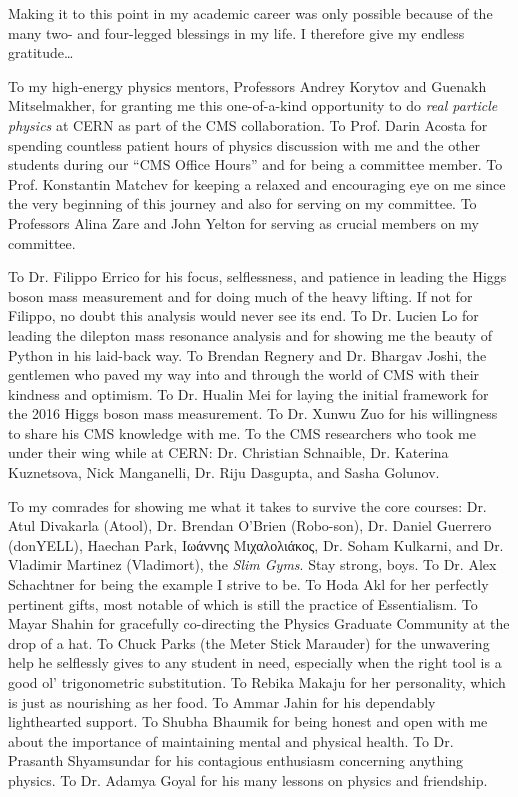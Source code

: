 
Making it to this point in my academic career was only possible because of the many two- and four-legged blessings in my life.
I therefore give my endless gratitude\ldots

To my high-energy physics mentors, Professors Andrey Korytov and Guenakh Mitselmakher, for granting me this one-of-a-kind opportunity to do \emph{real particle physics} at CERN as part of the CMS collaboration.
To Prof. Darin Acosta for spending countless patient hours of physics discussion with me and the other students during our ``CMS Office Hours'' and for being a committee member.
To Prof. Konstantin Matchev for keeping a relaxed and encouraging eye on me since the very beginning of this journey and also for serving on my committee.
To Professors Alina Zare and John Yelton for serving as crucial members on my committee.

To Dr. Filippo Errico for his focus, selflessness, and patience in leading the Higgs boson mass measurement and for doing much of the heavy lifting.
If not for Filippo, no doubt this analysis would never see its end.
To Dr. Lucien Lo for leading the dilepton mass resonance analysis and for showing me the beauty of Python in his laid-back way.
To Brendan Regnery and Dr. Bhargav Joshi, the gentlemen who paved my way into and through the world of CMS with their kindness and optimism.
To Dr. Hualin Mei for laying the initial framework for the 2016 Higgs boson mass measurement.
To Dr. Xunwu Zuo for his willingness to share his CMS knowledge with me.
To the CMS researchers who took me under their wing while at CERN: Dr. Christian Schnaible, Dr. Katerina Kuznetsova, Nick Manganelli, Dr. Riju Dasgupta, and Sasha Golunov.

To my comrades for showing me what it takes to survive the core courses: Dr. Atul Divakarla (Atool), Dr. Brendan O'Brien (Robo-son), Dr. Daniel Guerrero (donYELL), Haechan Park, \textgreek{Ιωάννης Μιχαλολιάκος}, Dr. Soham Kulkarni, and Dr. Vladimir Martinez (Vladimort), \ie the \emph{Slim Gyms}. Stay strong, boys.
To Dr. Alex Schachtner for being the example I strive to be.
To Hoda Akl for her perfectly pertinent gifts, most notable of which is still the practice of Essentialism.
To Mayar Shahin for gracefully co-directing the Physics Graduate Community at the drop of a hat.
To Chuck Parks (the Meter Stick Marauder) for the unwavering help he selflessly gives to any student in need, especially when the right tool is a good ol' trigonometric substitution.
To Rebika Makaju for her personality, which is just as nourishing as her food.
To Ammar Jahin for his dependably lighthearted support.
To Shubha Bhaumik for being honest and open with me about the importance of maintaining mental and physical health.
To Dr. Prasanth Shyamsundar for his contagious enthusiasm concerning anything physics.
To Dr. Adamya Goyal for his many lessons on physics and friendship.

